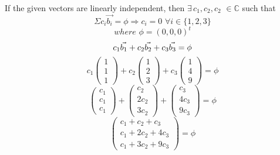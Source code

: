 \documentclass{article}
\begin{document}
If the given vectors are linearly independent, then $\exists \, c_1, c_2, c_2$ $\in \mathbb{C}$ such that
\begin{equation}
	\Sigma c_i \vec{b_i} = \phi \Longrightarrow c_i = 0 \, \,  \forall  i \in \{ 1, 2, 3\}
\end{equation}
\begin{equation}
where \, \, \phi = (0, 0, 0)^t 
\end{equation}
\begin{equation}
	c_1 \vec{b_1} + c_2 \vec{b_2} + c_3 \vec{b_3} = \phi\\
\end{equation}
\begin{equation}
	c_1 
	\begin{pmatrix}
	1 \\ 1 \\ 1 
	\end{pmatrix}
	+ c_2 
	\begin{pmatrix}
	1 \\ 2 \\ 3
	\end{pmatrix}		
	+ c_3 
	\begin{pmatrix}
	1 \\ 4 \\ 9
\end{pmatrix}		
	= \phi
\end{equation}
\begin{equation}
	\begin{pmatrix}
	c_1 \\ c_1 \\ c_1
	\end{pmatrix}
	+
	\begin{pmatrix}
	c_2 \\ 2c_2 \\ 3c_2
	\end{pmatrix}
	+
	\begin{pmatrix}
	c_3 \\ 4 c_3 \\ 9 c_3
	\end{pmatrix}
	= \phi
\end{equation}
\begin{equation}
\begin{pmatrix}
	c_1 + c_2 + c_3 \\ c_1 + 2 c_2 + 4 c_3 \\ c_1 + 3 c_2 + 9 c_3
\end{pmatrix}
= \phi
\end{equation}
\end{document}

